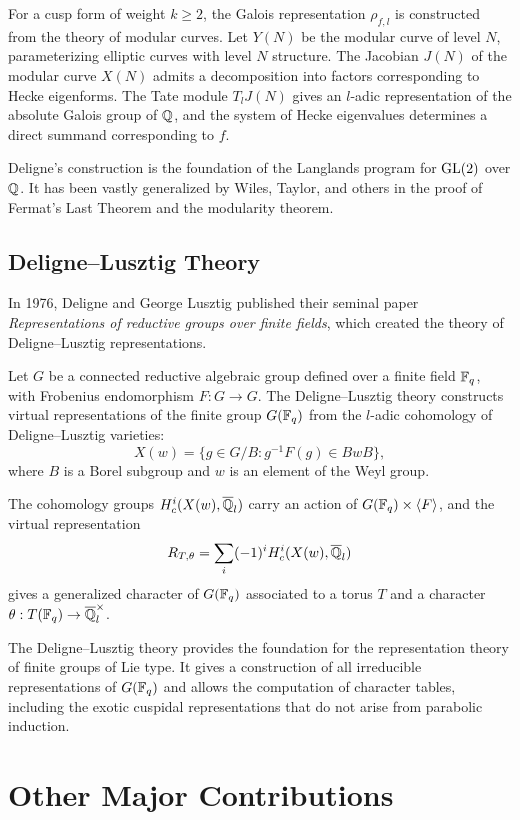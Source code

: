 For a cusp form of weight \(k \geq 2\), the Galois representation \(\rho_{f,l}\) is constructed from the theory of modular curves. Let \(Y(N)\) be the modular curve of level \(N\), parameterizing elliptic curves with level \(N\) structure. The Jacobian \(J(N)\) of the modular curve \(X(N)\) admits a decomposition into factors corresponding to Hecke eigenforms. The Tate module \(T_l J(N)\) gives an \(l\)-adic representation of the absolute Galois group of \(\mathbb{Q}\), and the system of Hecke eigenvalues determines a direct summand corresponding to \(f\).

Deligne's construction is the foundation of the Langlands program for \(\operatorname{GL}(2)\) over \(\mathbb{Q}\). It has been vastly generalized by Wiles, Taylor, and others in the proof of Fermat's Last Theorem and the modularity theorem.

\subsection{Deligne--Lusztig Theory}

In 1976, Deligne and George Lusztig published their seminal paper \textit{Representations of reductive groups over finite fields}, which created the theory of Deligne--Lusztig representations.

Let \(G\) be a connected reductive algebraic group defined over a finite field \(\mathbb{F}_q\), with Frobenius endomorphism \(F: G \to G\). The Deligne--Lusztig theory constructs virtual representations of the finite group \(G(\mathbb{F}_q)\) from the \(l\)-adic cohomology of Deligne--Lusztig varieties:
\[
X(w) = \{ g \in G / B : g^{-1} F(g) \in B w B \},
\]
where \(B\) is a Borel subgroup and \(w\) is an element of the Weyl group.

The cohomology groups \(H^i_c(X(w), \overline{\mathbb{Q}}_l)\) carry an action of \(G(\mathbb{F}_q) \times \langle F \rangle\), and the virtual representation
\[
R_{T,\theta} = \sum_i (-1)^i H^i_c(X(w), \overline{\mathbb{Q}}_l)
\]
gives a generalized character of \(G(\mathbb{F}_q)\) associated to a torus \(T\) and a character \(\theta: T(\mathbb{F}_q) \to \overline{\mathbb{Q}}_l^\times\).

The Deligne--Lusztig theory provides the foundation for the representation theory of finite groups of Lie type. It gives a construction of all irreducible representations of \(G(\mathbb{F}_q)\) and allows the computation of character tables, including the exotic cuspidal representations that do not arise from parabolic induction.

\section{Other Major Contributions}

